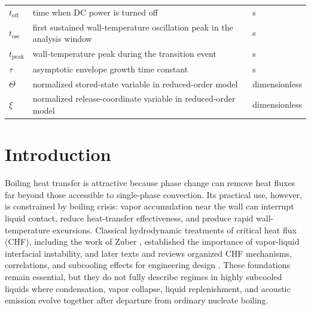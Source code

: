 \documentclass[final,1p,times]{elsarticle}
\begin{document}
\begin{center}
\begin{tabular}{@{}p{}p{}p{}@{}}
    $t_{\mathrm{off}}$ & time when DC power is turned off & s \\
    $t_{\mathrm{osc}}$ & first sustained wall-temperature oscillation peak in the analysis window & s \\
    $t_{\mathrm{peak}}$ & wall-temperature peak during the transition event & s \\
    $\tau$ & asymptotic envelope growth time constant & s \\
    $\Theta$ & normalized stored-state variable in reduced-order model & dimensionless \\
    $\xi$ & normalized release-coordinate variable in reduced-order model & dimensionless \\
\bottomrule
\end{tabular}
\end{center}
\normalsize

\section{Introduction}

Boiling heat transfer is attractive because phase change can remove heat fluxes far beyond those accessible to single-phase convection. Its practical use, however, is constrained by boiling crisis: vapor accumulation near the wall can interrupt liquid contact, reduce heat-transfer effectiveness, and produce rapid wall-temperature excursions. Classical hydrodynamic treatments of critical heat flux (CHF), including the work of Zuber \citep{zuber_1958_stability,zuber_1959_hydrodynamic}, established the importance of vapor-liquid interfacial instability, and later texts and reviews organized CHF mechanisms, correlations, and subcooling effects for engineering design \citep{carey_2020_phase_change,liang_2018_chf_review}. These foundations remain essential, but they do not fully describe regimes in highly subcooled liquids where condensation, vapor collapse, liquid replenishment, and acoustic emission evolve together after departure from ordinary nucleate boiling.
\end{document}
